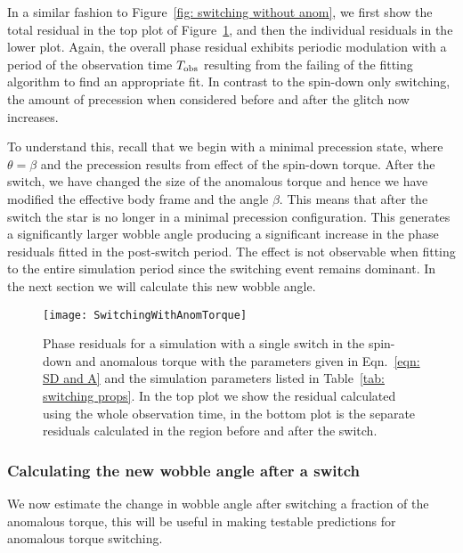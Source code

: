 \documentclass[../full_thesis/full_thesis.tex]{subfiles}
\begin{document}
In a similar fashion to Figure~\ref{fig: switching without anom}, we first show
the total residual in the top plot of Figure~\ref{fig: switching with anom}, and
then the individual residuals in the lower plot. Again, the overall phase
residual exhibits periodic modulation with a period of the observation time $T_{\textrm{obs}}$
resulting from the failing of the fitting algorithm to find an appropriate fit.
In contrast to the spin-down only switching, the amount of precession when
considered before and after the glitch now increases.

To understand this, recall that we begin with a minimal precession state, where
$\theta = \beta$ and the precession results from effect of the spin-down
torque.  After the switch, we have changed the size of the anomalous torque and
hence we have modified the effective body frame and the angle $\beta$. This
means that after the switch the star is no longer in a minimal
precession configuration.
This generates a significantly larger wobble angle producing a significant
increase in the phase residuals fitted in the post-switch period. The effect is
not observable when fitting to the entire simulation period since the switching
event remains dominant. In the next section we will calculate this new wobble
angle.
\begin{figure}[htb]
\texttt{[image: SwitchingWithAnomTorque]}
\caption{Phase residuals for a simulation with a single switch in the spin-down
and anomalous torque with the parameters given in Eqn.~\eqref{eqn: SD and A}
and the simulation parameters listed in Table~\ref{tab: switching props}. In
the top plot we show the residual calculated using the whole observation time,
in the bottom plot is the separate residuals calculated in the region before
and after the switch.}
\label{fig: switching with anom}
\end{figure}

\subsubsection{Calculating the new wobble angle after a switch}
We now estimate the change in wobble angle after switching a fraction of the
anomalous torque, this will be useful in making testable predictions for
anomalous torque switching.
\end{document}
